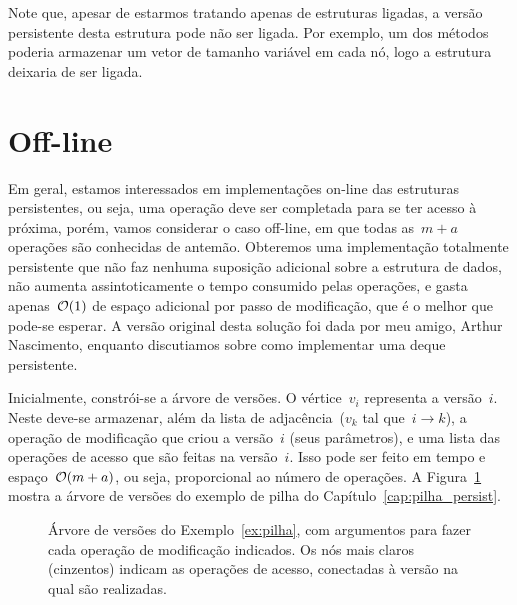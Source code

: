 \documentclass[main.tex]{subfiles}
\begin{document}
Note que, apesar de estarmos tratando apenas de estruturas ligadas, a versão persistente desta estrutura pode não ser ligada. Por exemplo, um dos métodos poderia armazenar um vetor de tamanho variável em cada nó, logo a estrutura deixaria de ser ligada.

\section{Off-line}

Em geral, estamos interessados em implementações on-line das estruturas persistentes, ou seja, uma operação deve ser completada para se ter acesso à próxima, porém, vamos considerar o caso off-line, em que todas as~$m+a$ operações são conhecidas de antemão. Obteremos uma implementação totalmente persistente que não faz nenhuma suposição adicional sobre a estrutura de dados, não aumenta assintoticamente o tempo consumido pelas operações, e gasta apenas~$\mathcal{O}(1)$ de espaço adicional por passo de modificação, que é o melhor que pode-se esperar. A versão original desta solução foi dada por meu amigo, Arthur Nascimento, enquanto discutiamos sobre como implementar uma deque persistente.

Inicialmente, constrói-se a árvore de versões. O vértice~$v_i$ representa a versão~$i$. Neste deve-se armazenar, além da lista de adjacência~($v_k$ tal que~$i \rightarrow k$), a operação de modificação que criou a versão~$i$ (seus parâmetros), e uma lista das operações de acesso que são feitas na versão~$i$. Isso pode ser feito em tempo e espaço~$\mathcal{O}(m+a)$, ou seja, proporcional ao número de operações.
A Figura~\ref{fig:vertree_ex} mostra a árvore de versões do exemplo de pilha do Capítulo~\ref{cap:pilha_persist}.

\begin{figure}
	\centering
	\caption{Árvore de versões do Exemplo~\ref{ex:pilha}, com argumentos para fazer cada operação de modificação indicados. Os nós mais claros (cinzentos) indicam as operações de acesso, conectadas à versão na qual são realizadas.} \label{fig:vertree_ex}
\end{figure}
\end{document}
